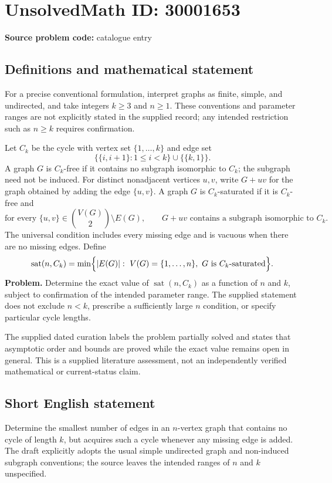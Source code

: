 \documentclass[11pt]{article}
\begin{document}
\section*{UnsolvedMath ID: 30001653}
\textbf{Source problem code:} catalogue entry
\subsection{Definitions and mathematical statement}
For a precise conventional formulation, interpret graphs as finite, simple, and undirected, and take integers \(k\geq 3\) and \(n\geq 1\). These conventions and parameter ranges are not explicitly stated in the supplied record; any intended restriction such as \(n\geq k\) requires confirmation.

Let \(C_k\) be the cycle with vertex set \(\{1,\ldots,k\}\) and edge set
\[
\bigl\{\{i,i+1\}:1\leq i<k\bigr\}\cup\bigl\{\{k,1\}\bigr\}.
\]
A graph \(G\) is \(C_k\)-free if it contains no subgraph isomorphic to \(C_k\); the subgraph need not be induced. For distinct nonadjacent vertices \(u,v\), write \(G+uv\) for the graph obtained by adding the edge \(\{u,v\}\). A graph \(G\) is \(C_k\)-saturated if it is \(C_k\)-free and
\[
\text{for every }\{u,v\}\in\binom{V(G)}{2}\setminus E(G),
\qquad G+uv\text{ contains a subgraph isomorphic to }C_k.
\]
The universal condition includes every missing edge and is vacuous when there are no missing edges. Define
\[
\operatorname{sat}(n,C_k)
=
\min\Bigl\{|E(G)|:\ V(G)=\{1,\ldots,n\},\ G\text{ is }C_k\text{-saturated}\Bigr\}.
\]
\textbf{Problem.} Determine the exact value of \(\operatorname{sat}(n,C_k)\) as a function of \(n\) and \(k\), subject to confirmation of the intended parameter range. The supplied statement does not exclude \(n<k\), prescribe a sufficiently large \(n\) condition, or specify particular cycle lengths.

The supplied dated curation labels the problem partially solved and states that asymptotic order and bounds are proved while the exact value remains open in general. This is a supplied literature assessment, not an independently verified mathematical or current-status claim.
\subsection{Short English statement}
Determine the smallest number of edges in an \(n\)-vertex graph that contains no cycle of length \(k\), but acquires such a cycle whenever any missing edge is added. The draft explicitly adopts the usual simple undirected graph and non-induced subgraph conventions; the source leaves the intended ranges of \(n\) and \(k\) unspecified.
\end{document}
